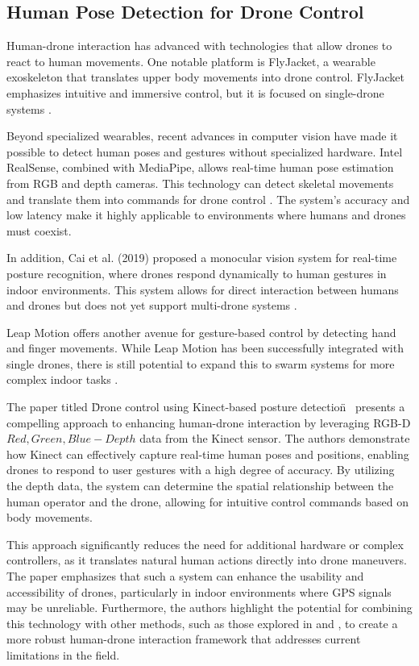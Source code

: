 \subsection{Human Pose Detection for Drone Control}

Human-drone interaction has advanced with technologies that allow drones to react to human movements. One notable platform is FlyJacket, a wearable exoskeleton that translates upper body movements into drone control. FlyJacket emphasizes intuitive and immersive control, but it is focused on single-drone systems \cite{flyjacket}.

Beyond specialized wearables, recent advances in computer vision have made it possible to detect human poses and gestures without specialized hardware. Intel RealSense, combined with MediaPipe, allows real-time human pose estimation from \gls{RGB} and depth cameras. This technology can detect skeletal movements and translate them into commands for drone control \cite{realsense_mediapipe}. The system’s accuracy and low latency make it highly applicable to environments where humans and drones must coexist.

In addition, Cai et al. (2019) proposed a monocular vision system for real-time posture recognition, where drones respond dynamically to human gestures in indoor environments. This system allows for direct interaction between humans and drones but does not yet support multi-drone systems \cite{cai_human_drone}.

Leap Motion offers another avenue for gesture-based control by detecting hand and finger movements. While Leap Motion has been successfully integrated with single drones, there is still potential to expand this to swarm systems for more complex indoor tasks \cite{leap_motion}.

The paper titled \"Drone control using Kinect-based posture detection\"~\cite{realsense_mediapipe} presents a compelling approach to enhancing human-drone interaction by leveraging \gls{RGB-D} \(Red, Green, Blue-Depth\) data from the Kinect sensor. The authors demonstrate how Kinect can effectively capture real-time human poses and positions, enabling drones to respond to user gestures with a high degree of accuracy. By utilizing the depth data, the system can determine the spatial relationship between the human operator and the drone, allowing for intuitive control commands based on body movements.

This approach significantly reduces the need for additional hardware or complex controllers, as it translates natural human actions directly into drone maneuvers. The paper emphasizes that such a system can enhance the usability and accessibility of drones, particularly in indoor environments where GPS signals may be unreliable. Furthermore, the authors highlight the potential for combining this technology with other methods, such as those explored in \cite{realsense_mediapipe} and \cite{flyjacket}, to create a more robust human-drone interaction framework that addresses current limitations in the field.

